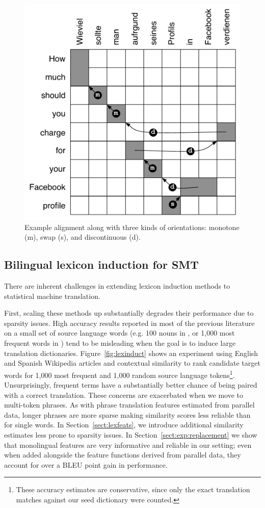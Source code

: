 \documentclass[11pt]{article}
\newcommand{\secref}[1]{Section~\ref{#1}}
\newcommand{\figref}[1]{Figure~\ref{#1}}
\begin{document}
\begin{figure}[t]
\vskip 0.1in
\begin{center}
\includegraphics[width=0.8 \linewidth]{../figures/reorderfeats/reorderfeats.pdf}
\caption{Example alignment along with three kinds of orientations: monotone (m), swap (s), and discontinuous (d). }
\label{fig:reorderfeats} 
\end{center}
\end{figure}


 \subsection{Bilingual lexicon induction for SMT} \label{sect:bckg:lexind}
 
There are inherent challenges in extending lexicon induction methods to statistical machine translation.  

First, scaling these methods up substantially degrades their performance due to sparsity issues. High accuracy results reported in most of the previous literature on a small set of source language words (e.g. 100 nouns in , or 1,000 most frequent words in \cite{Koehn:2002}) tend to be misleading when the goal is to induce large translation dictionaries. \figref{fig:lexinduct} shows an experiment using English and Spanish Wikipedia articles and contextual similarity to rank candidate target words for 1,000 most frequent and 1,000 random source language tokens\footnote{These accuracy estimates are conservative, since only the exact translation matches against our seed dictionary were counted.}.  Unsurprisingly, frequent terms have a substantially better chance of being paired with a correct translation.  These concerns are exacerbated when we move to multi-token phrases.  As with phrase translation features estimated from parallel data, longer phrases are more sparse making similarity scores less reliable than for single words.  In \secref{sect:lexfeats}, we introduce additional similarity estimates less prone to sparsity issues.  In \secref{sect:exp:replacement} we show that monolingual features are very informative and reliable in our setting; even when added alongside the feature functions derived from parallel data, they account for over a BLEU point gain in performance.
\end{document}
